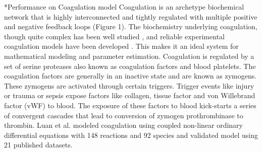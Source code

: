 \documentclass[12pt]{article}
\makeatletter
\renewcommand\subsection{\@startsection
	{subsection}{2}{0mm}
	{-0.05in}
	{-0.5\baselineskip}
	{\normalfont\normalsize\bfseries}}
\makeatother
\begin{document}
\subsection*{Performance on Coagulation model}
Coagulation is an archetype biochemical network that is highly interconnected and tightly regulated with multiple positive and negative feedback loops (Figure 1). The biochemistry underlying coagulation, though quite complex has been well studied \cite{mann2003dynamics,mann2003all,mann2003thrombin,vogler2009contact,diamond2013systems,fogelson2005coagulation,anand2003model}, and reliable experimental coagulation models have been developed \cite{hockin2002model,chatterjee2010systems,mann2006models,luan2007computationally}. This makes it an ideal system for mathematical modeling and parameter estimation. Coagulation is regulated by a set of serine proteases also known as coagulation factors and blood platelets. The coagulation factors are generally in an inactive state and are known as zymogens. These zymogens are activated through certain triggers. Trigger events like injury or trauma or sepsis expose factors like collagen, tissue factor and von Willebrand factor (vWF) to blood. The exposure of these factors to blood kick-starts a series of convergent cascades that lead to conversion of zymogen prothrombinase to thrombin.   Luan et al. modeled coagulation using coupled non-linear ordinary differential equations with 148 reactions and 92 species \cite{luan2007computationally} and validated model using 21 published datasets. 
\end{document}
